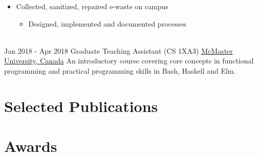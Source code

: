 \documentclass[letterpaper]{twentysecondcv} %
\begin{document}
\begin{twenty}
{\begin{itemize}
      \item Collected, sanitized, repaired e-waste on campus
      \begin{itemize}
        \item Designed, implemented and documented processes
      \end{itemize}
    \end{itemize}
  }
  \\
  \twentyitem
  {Jan 2018 -}
  {Apr 2018}
  {Graduate Teaching Assistant (CS 1XA3)}
  {\href{https://www.mcmaster.ca/}{McMaster University, Canada}}
  {}
  {An introductory course covering core concepts in functional programming and practical programming skills in Bash, Haskell and Elm.
}
\end{twenty}
\section{Selected Publications}
\vspace{-.5em}
\printbibliography[heading=none]
\section{Awards}
\end{document}
